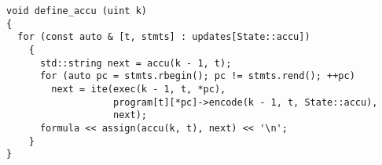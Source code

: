 %
%

\begin{lstlisting}[style=c++]
void define_accu (uint k)
{
  for (const auto & [t, stmts] : updates[State::accu])
    {
      std::string next = accu(k - 1, t);
      for (auto pc = stmts.rbegin(); pc != stmts.rend(); ++pc)
        next = ite(exec(k - 1, t, *pc),
                   program[t][*pc]->encode(k - 1, t, State::accu),
                   next);
      formula << assign(accu(k, t), next) << '\n';
    }
}
\end{lstlisting}

